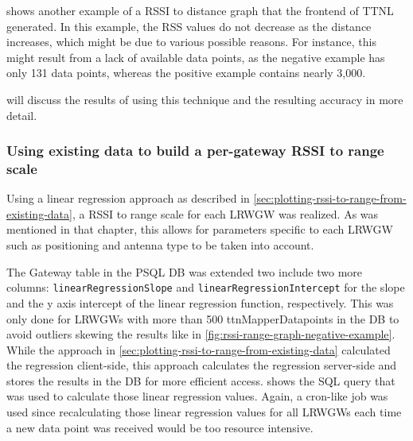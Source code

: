 shows another example of a \ac{RSSI} to distance graph that the frontend of \ac{TTNL} generated.
In this example, the \ac{RSS} values do not decrease as the distance increases, which might be due to various possible reasons.
For instance, this might result from a lack of available data points, as the negative example has only 131 data points, whereas the positive example contains nearly 3,000.

 will discuss the results of using this technique and the resulting accuracy in more detail.

\subsubsection{Using existing data to build a per-gateway \acs{RSSI} to range scale}\label{subsubsec:per-gateway-rssi-to-range-scale}

Using a linear regression approach as described in \cref{sec:plotting-rssi-to-range-from-existing-data}, a \ac{RSSI} to range scale for each \acl{LRWGW} was realized.
As was mentioned in that chapter, this allows for parameters specific to each \acl{LRWGW} such as positioning and antenna type to be taken into account.

The Gateway table in the \ac{PSQL} \ac{DB} was extended two include two more columns: \texttt{linear\-Regres\-sion\-Slope} and \texttt{linear\-Re\-gres\-sion\-Inter\-cept} for the slope and the y axis intercept of the linear regression function, respectively.
This was only done for \aclp{LRWGW} with more than 500 ttnMapperDatapoints in the \ac{DB} to avoid outliers skewing the results like in \cref{fig:rssi-range-graph-negative-example}.
While the approach in \cref{sec:plotting-rssi-to-range-from-existing-data} calculated the regression client-side, this approach calculates the regression server-side and stores the results in the \ac{DB} for more efficient access.
 shows the \ac{SQL} query that was used to calculate those linear regression values.
Again, a cron-like job was used since recalculating those linear regression values for all \aclp{LRWGW} each time a new data point was received would be too resource intensive.

